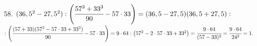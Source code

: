 58. $(36,5^2-27,5^2): \left(\cfrac{57^3+33^3}{90}-57\cdot 33\right)=
(36,5-27,5)(36,5+27,5):$\\$:\left(\cfrac{(57+33)(57^2-57\cdot33+33^2)}{90}-57\cdot 33\right)=
9\cdot64:\left(57^2-2\cdot57\cdot33+33^2\right)=\cfrac{9\cdot64}{(57-33)^2}=\cfrac{9\cdot64}{24^2}=1.$\\
